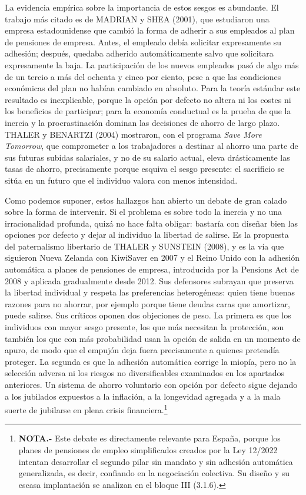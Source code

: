 \documentclass[10pt,a4paper]{article}
\begin{document}
La evidencia empírica sobre la importancia de estos sesgos es abundante. El trabajo más citado es de MADRIAN y SHEA (2001), que estudiaron una empresa estadounidense que cambió la forma de adherir a sus empleados al plan de pensiones de empresa. Antes, el empleado debía solicitar expresamente su adhesión; después, quedaba adherido automáticamente salvo que solicitara expresamente la baja. La participación de los nuevos empleados pasó de algo más de un tercio a más del ochenta y cinco por ciento, pese a que las condiciones económicas del plan no habían cambiado en absoluto. Para la teoría estándar este resultado es inexplicable, porque la opción por defecto no altera ni los costes ni los beneficios de participar; para la economía conductual es la prueba de que la inercia y la procrastinación dominan las decisiones de ahorro de largo plazo. THALER y BENARTZI (2004) mostraron, con el programa \textit{Save More Tomorrow}, que comprometer a los trabajadores a destinar al ahorro una parte de sus futuras subidas salariales, y no de su salario actual, eleva drásticamente las tasas de ahorro, precisamente porque esquiva el sesgo presente: el sacrificio se sitúa en un futuro que el individuo valora con menos intensidad.

Como podemos suponer, estos hallazgos han abierto un debate de gran calado sobre la forma de intervenir. Si el problema es sobre todo la inercia y no una irracionalidad profunda, quizá no hace falta obligar: bastaría con diseñar bien las opciones por defecto y dejar al individuo la libertad de salirse. Es la propuesta del paternalismo libertario de THALER y SUNSTEIN (2008), y es la vía que siguieron Nueva Zelanda con KiwiSaver en 2007 y el Reino Unido con la adhesión automática a planes de pensiones de empresa, introducida por la Pensions Act de 2008 y aplicada gradualmente desde 2012. Sus defensores subrayan que preserva la libertad individual y respeta las preferencias heterogéneas: quien tiene buenas razones para no ahorrar, por ejemplo porque tiene deudas caras que amortizar, puede salirse. Sus críticos oponen dos objeciones de peso. La primera es que los individuos con mayor sesgo presente, los que más necesitan la protección, son también los que con más probabilidad usan la opción de salida en un momento de apuro, de modo que el empujón deja fuera precisamente a quienes pretendía proteger. La segunda es que la adhesión automática corrige la miopía, pero no la selección adversa ni los riesgos no diversificables examinados en los apartados anteriores. Un sistema de ahorro voluntario con opción por defecto sigue dejando a los jubilados expuestos a la inflación, a la longevidad agregada y a la mala suerte de jubilarse en plena crisis financiera.\footnote{\textbf{NOTA.-} Este debate es directamente relevante para España, porque los planes de pensiones de empleo simplificados creados por la Ley 12/2022 intentan desarrollar el segundo pilar sin mandato y sin adhesión automática generalizada, es decir, confiando en la negociación colectiva. Su diseño y su escasa implantación se analizan en el bloque III (3.1.6).
}
\end{document}
